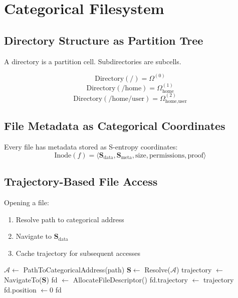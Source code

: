 \documentclass[twocolumn,10pt]{article}
\theoremstyle{definition}
\theoremstyle{remark}
\newcommand{\cataddr}{\mathcal{A}}
\newcommand{\Scoord}{\mathbf{S}}
\begin{document}
\section{Categorical Filesystem}
\label{sec:filesystem}

\subsection{Directory Structure as Partition Tree}

A directory is a partition cell. Subdirectories are subcells.

\begin{equation}
    \text{Directory}(/) = \Omega^{(0)}
\end{equation}
\begin{equation}
    \text{Directory}(/\text{home}) = \Omega^{(1)}_{\text{home}}
\end{equation}
\begin{equation}
    \text{Directory}(/\text{home/user}) = \Omega^{(2)}_{\text{home,user}}
\end{equation}

\subsection{File Metadata as Categorical Coordinates}

Every file has metadata stored as S-entropy coordinates:
\begin{equation}
    \text{Inode}(f) = \langle \Scoord_{\text{data}}, \Scoord_{\text{meta}}, \text{size}, \text{permissions}, \text{proof} \rangle
\end{equation}

\subsection{Trajectory-Based File Access}

Opening a file:
\begin{enumerate}
    \item Resolve path to categorical address
    \item Navigate to $\Scoord_{\text{data}}$
    \item Cache trajectory for subsequent accesses
\end{enumerate}

\begin{algorithm}
\caption{Open File}
\begin{algorithmic}[1]
    \State $\cataddr \gets$ PathToCategoricalAddress(path)
    \State $\Scoord \gets$ Resolve($\cataddr$)
    \State trajectory $\gets$ NavigateTo($\Scoord$)
    \State fd $\gets$ AllocateFileDescriptor()
    \State fd.trajectory $\gets$ trajectory
    \State fd.position $\gets 0$
    \State \Return fd
\EndFunction
\end{algorithmic}
\end{algorithm}
\end{document}

